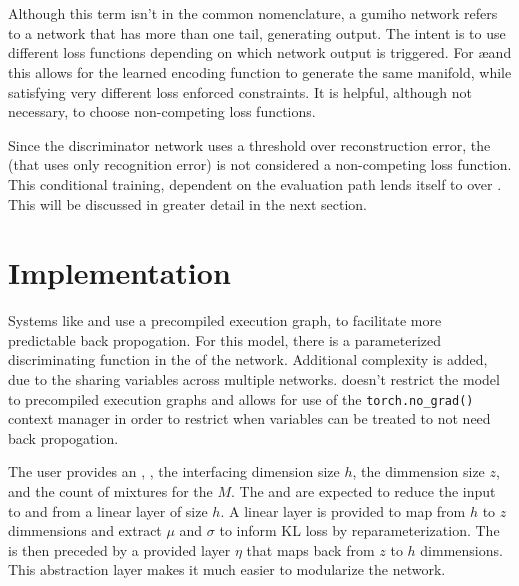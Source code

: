 \documentclass{article}
\begin{document}
\begin{multicols}{2}
\section{}

Although this term isn't in the common nomenclature, a gumiho network refers to a network
that has more than one tail, generating output. The intent is to use different loss functions depending
on which network output is triggered. For \ae and \vae this allows for the learned
encoding function to generate the same manifold, while satisfying very different loss
enforced constraints. It is helpful, although not necessary, to choose non-competing
loss functions.

\resizebox{\columnwidth}{!}{}

Since the discriminator network uses a threshold over reconstruction error, the \vae
(that uses only recognition error) is not considered a non-competing loss function.
This conditional training, dependent on the evaluation path lends itself to \pytorch
over \keras. This will be discussed in greater detail in the next section.


\section{Implementation}

Systems like \keras and \tensorflow use a precompiled execution graph, to facilitate
more predictable back propogation. For this model, there is a parameterized
discriminating function in the \bottle of the network. Additional complexity is added,
due to the sharing \encoder variables across multiple \decoder networks. \pytorch doesn't
restrict the model to precompiled execution graphs and allows for use of the
\texttt{torch.no\_grad()} context manager in order to restrict when variables can be
treated to not need back propogation.

The user provides an \encoder, \decoder, the interfacing dimension size $h$,
the \bottle dimmension size $z$, and the count of mixtures for the \GMM $M$. The \encoder
and \decoder are expected to reduce the input to and from a linear layer of size $h$.
A linear \bottle layer is provided to map from $h$ to $z$
dimmensions and extract $\mu$ and $\sigma$ to inform KL loss by reparameterization. The
\decoder is then preceded by a provided layer $\eta$ that maps back from $z$ to $h$
dimmensions. This abstraction layer makes it much easier to modularize the network.


\end{multicols}
\end{document}
